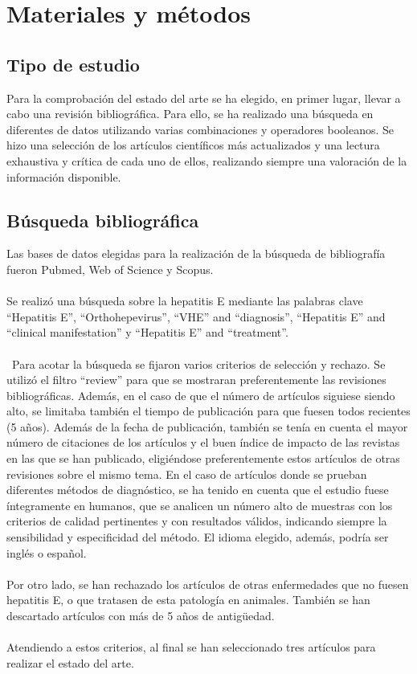 \documentclass[11 pt]{article}
\begin{document}
\section{Materiales y métodos}
\subsection{Tipo de estudio}
Para la comprobación del estado del arte se ha elegido, en primer lugar, llevar a cabo una revisión bibliográfica. Para ello, se ha realizado una búsqueda en diferentes de datos utilizando varias combinaciones y operadores booleanos. Se hizo una selección de los artículos científicos más actualizados y una lectura exhaustiva y crítica de cada uno de ellos, realizando siempre una valoración de la información disponible. 
\subsection{Búsqueda bibliográfica}
Las bases de datos elegidas para la realización de la búsqueda de bibliografía fueron Pubmed, Web of Science y Scopus.\\\\  
Se realizó una búsqueda sobre la hepatitis E mediante las palabras clave “Hepatitis E”, “Orthohepevirus”, “VHE” and “diagnosis”, “Hepatitis E” and “clinical manifestation” y “Hepatitis E” and “treatment”. \\\\\
Para acotar la búsqueda se fijaron varios criterios de selección y rechazo. Se utilizó el filtro “review” para que se mostraran preferentemente las revisiones bibliográficas. Además, en el caso de que el número de artículos siguiese siendo alto, se limitaba también el tiempo de publicación para que fuesen todos recientes (5 años). Además de la fecha de publicación, también se tenía en cuenta el mayor número de citaciones de los artículos y el buen índice de impacto de las revistas en las que se han publicado, eligiéndose preferentemente estos artículos de otras revisiones sobre el mismo tema. En el caso de artículos donde se prueban diferentes métodos de diagnóstico, se ha tenido en cuenta que el estudio fuese íntegramente en humanos, que se analicen un número alto de muestras con los criterios de calidad pertinentes y con resultados válidos, indicando siempre la sensibilidad y especificidad del método. El idioma elegido, además, podría ser inglés o español.\\\\ 
Por otro lado, se han rechazado los artículos de otras enfermedades que no fuesen hepatitis E, o que tratasen de esta patología en animales. También se han descartado artículos con más de 5 años de antigüedad.\\\\    
Atendiendo a estos criterios, al final se han seleccionado tres artículos para realizar el estado del arte. 
\end{document}

